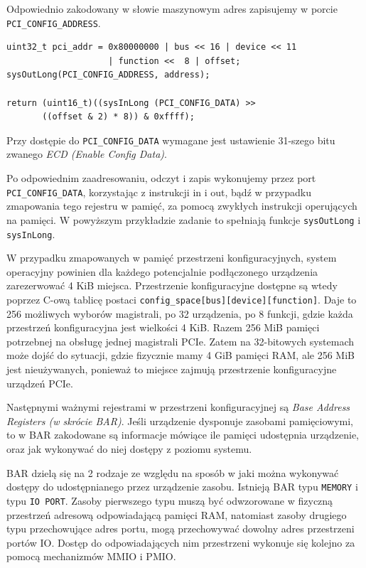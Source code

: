 \documentclass[shortabstract,inz]{iithesis}
\begin{document}
Odpowiednio zakodowany w słowie maszynowym adres zapisujemy w porcie \texttt{PCI\_CONFIG\_ADDRESS}.

\begin{lstlisting}[caption=Odczyt z przestrzeni konfiguracyjnej,escapechar=ß]
uint32_t pci_addr = 0x80000000 | bus << 16 | device << 11 
                    | function <<  8 | offset;
sysOutLong(PCI_CONFIG_ADDRESS, address);

return (uint16_t)((sysInLong (PCI_CONFIG_DATA) >> 
       ((offset & 2) * 8)) & 0xffff);
\end{lstlisting}

Przy dostępie do \texttt{PCI\_CONFIG\_DATA} wymagane jest ustawienie 31-szego bitu 
zwanego \textit{ECD (Enable Config Data)}.

Po odpowiednim zaadresowaniu, odczyt i zapis wykonujemy przez port \\
\texttt{PCI\_CONFIG\_DATA},
korzystając z instrukcji in i out, bądź w przypadku zmapowania tego rejestru w pamięć,
za pomocą zwykłych instrukcji operujących na pamięci.
W powyższym przykładzie zadanie to spełniają funkcje \texttt{sysOutLong} i \texttt{sysInLong}.

W przypadku zmapowanych w pamięć przestrzeni konfiguracyjnych, system operacyjny
powinien dla każdego potencjalnie podłączonego urządzenia zarezerwować 4 KiB miejsca. 
Przestrzenie konfiguracyjne dostępne są wtedy poprzez C-ową tablicę postaci
\texttt{config\_space[bus][device][function]}.
Daje to 256 możliwych wyborów magistrali, po 32 urządzenia, po 8 funkcji, gdzie
każda przestrzeń konfiguracyjna jest wielkości 4 KiB. Razem 256 MiB pamięci
potrzebnej na obsługę jednej magistrali PCIe.
Zatem na 32-bitowych systemach może dojść do sytuacji, gdzie fizycznie mamy 4 GiB pamięci RAM, ale 256 MiB
jest nieużywanych, ponieważ to miejsce zajmują przestrzenie konfiguracyjne urządzeń PCIe.

Następnymi ważnymi rejestrami w przestrzeni konfiguracyjnej są \textit{Base Address Registers (w skrócie BAR)}.
Jeśli urządzenie dysponuje zasobami pamięciowymi, to w BAR zakodowane są informacje
mówiące ile pamięci udostępnia urządzenie, oraz jak wykonywać do niej dostępy z
poziomu systemu.

BAR dzielą się na 2 rodzaje ze względu na sposób w jaki można wykonywać dostępy do
udostępnianego przez urządzenie zasobu.
Istnieją BAR typu \texttt{MEMORY} i typu \texttt{IO PORT}. Zasoby pierwszego typu
muszą być odwzorowane w fizyczną przestrzeń adresową odpowiadającą pamięci RAM,
natomiast zasoby drugiego typu przechowujące adres portu, mogą przechowywać dowolny adres
przestrzeni portów IO. Dostęp do odpowiadających nim przestrzeni wykonuje się kolejno za 
pomocą mechanizmów MMIO i PMIO.
\end{document}
